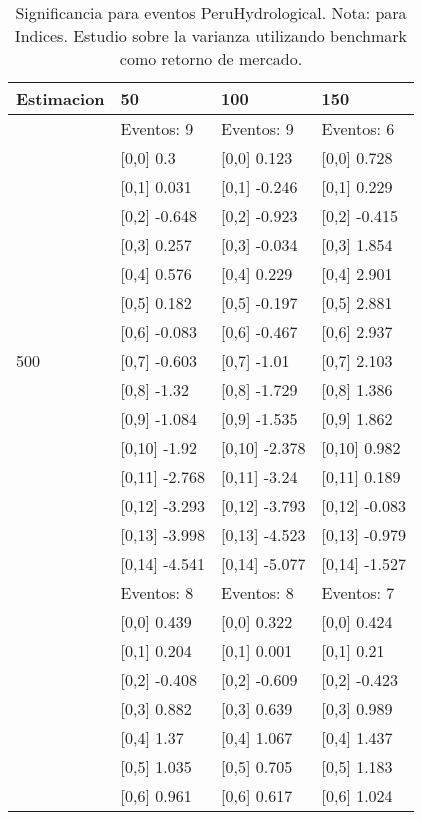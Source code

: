 \begin{table}

\caption{Significancia para eventos PeruHydrological. Nota: para Indices. Estudio sobre la varianza utilizando benchmark como retorno de mercado.}
\centering
\begin{tabular}[t]{llll}
\toprule
Estimacion & 50 & 100 & 150\\
\midrule
 & Eventos:  9 & Eventos:  9 & Eventos:  6\\
 & {}[0,0] 0.3 & {}[0,0] 0.123 & {}[0,0] 0.728\\
 & {}[0,1] 0.031 & {}[0,1] -0.246 & {}[0,1] 0.229\\
 & {}[0,2] -0.648 & {}[0,2] -0.923 & {}[0,2] -0.415\\
 & {}[0,3] 0.257 & {}[0,3] -0.034 & {}[0,3] 1.854\\
\addlinespace
 & {}[0,4] 0.576 & {}[0,4] 0.229 & {}[0,4] 2.901\\
 & {}[0,5] 0.182 & {}[0,5] -0.197 & {}[0,5] 2.881\\
 & {}[0,6] -0.083 & {}[0,6] -0.467 & {}[0,6] 2.937\\
500 & {}[0,7] -0.603 & {}[0,7] -1.01 & {}[0,7] 2.103\\
 & {}[0,8] -1.32 & {}[0,8] -1.729 & {}[0,8] 1.386\\
\addlinespace
 & {}[0,9] -1.084 & {}[0,9] -1.535 & {}[0,9] 1.862\\
 & {}[0,10] -1.92 & {}[0,10] -2.378 & {}[0,10] 0.982\\
 & {}[0,11] -2.768 & {}[0,11] -3.24 & {}[0,11] 0.189\\
 & {}[0,12] -3.293 & {}[0,12] -3.793 & {}[0,12] -0.083\\
 & {}[0,13] -3.998 & {}[0,13] -4.523 & {}[0,13] -0.979\\
\addlinespace
 & {}[0,14] -4.541 & {}[0,14] -5.077 & {}[0,14] -1.527\\
 & Eventos:  8 & Eventos:  8 & Eventos:  7\\
 & {}[0,0] 0.439 & {}[0,0] 0.322 & {}[0,0] 0.424\\
 & {}[0,1] 0.204 & {}[0,1] 0.001 & {}[0,1] 0.21\\
 & {}[0,2] -0.408 & {}[0,2] -0.609 & {}[0,2] -0.423\\
\addlinespace
 & {}[0,3] 0.882 & {}[0,3] 0.639 & {}[0,3] 0.989\\
 & {}[0,4] 1.37 & {}[0,4] 1.067 & {}[0,4] 1.437\\
 & {}[0,5] 1.035 & {}[0,5] 0.705 & {}[0,5] 1.183\\
 & {}[0,6] 0.961 & {}[0,6] 0.617 & {}[0,6] 1.024\\

\end{tabular}
\end{table}

